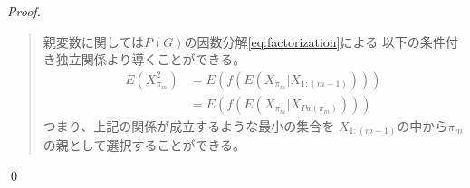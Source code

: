 \begin{proof}
\begin{quote}
\begin{enumerate}[label=(\roman*)]
\begin{enumerate}[label=(ii - \alph*)]
      \end{enumerate}

    \end{enumerate}

    親変数に関しては$P(G)の因数分解$\eqref{eq:factorization}による
    以下の条件付き独立関係より導くことができる。
    \begin{align*}
      E(X_{\pi_m}^2) &= E(f(E(X_{\pi_m} | X_{1:(m-1)}))) \\
                     &= E(f(E(X_{\pi_m} | X_{Pa(\pi_m)})))
    \end{align*}
    つまり、上記の関係が成立するような最小の集合を
    $X_{1:(m-1)}$の中から$\pi_m$の親として選択することができる。
  \end{quote}

  \qed
\end{proof}
